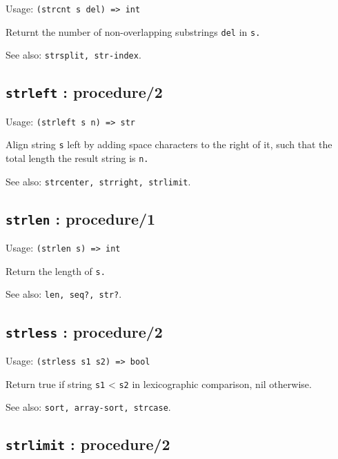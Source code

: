 \documentclass[
]{article}
\newcommand{\passthrough}[1]{#1}
\begin{document}
Usage: \passthrough{\lstinline!(strcnt s del) => int!}

Returnt the number of non-overlapping substrings
\passthrough{\lstinline!del!} in \passthrough{\lstinline!s.!}

See also: \passthrough{\lstinline!strsplit, str-index!}.

\hypertarget{strleft-procedure2-1}{%
\subsection{\texorpdfstring{\texttt{strleft} :
procedure/2}{strleft : procedure/2}}\label{strleft-procedure2-1}}

Usage: \passthrough{\lstinline!(strleft s n) => str!}

Align string \passthrough{\lstinline!s!} left by adding space characters
to the right of it, such that the total length the result string is
\passthrough{\lstinline!n.!}

See also: \passthrough{\lstinline!strcenter, strright, strlimit!}.

\hypertarget{strlen-procedure1-1}{%
\subsection{\texorpdfstring{\texttt{strlen} :
procedure/1}{strlen : procedure/1}}\label{strlen-procedure1-1}}

Usage: \passthrough{\lstinline!(strlen s) => int!}

Return the length of \passthrough{\lstinline!s.!}

See also: \passthrough{\lstinline!len, seq?, str?!}.

\hypertarget{strless-procedure2-1}{%
\subsection{\texorpdfstring{\texttt{strless} :
procedure/2}{strless : procedure/2}}\label{strless-procedure2-1}}

Usage: \passthrough{\lstinline!(strless s1 s2) => bool!}

Return true if string \passthrough{\lstinline!s1!} \textless{}
\passthrough{\lstinline!s2!} in lexicographic comparison, nil otherwise.

See also: \passthrough{\lstinline!sort, array-sort, strcase!}.

\hypertarget{strlimit-procedure2-1}{%
\subsection{\texorpdfstring{\texttt{strlimit} :
procedure/2}{strlimit : procedure/2}}\label{strlimit-procedure2-1}}
\end{document}
